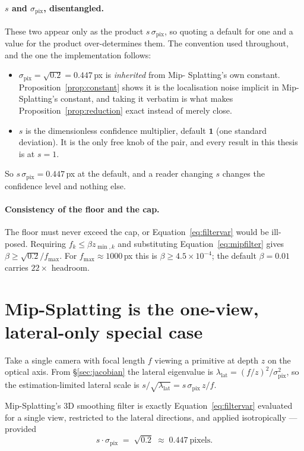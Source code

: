 \paragraph{$s$ and $\sigma_{\mathrm{pix}}$, disentangled.} These two appear only
as the product $s\,\sigma_{\mathrm{pix}}$, so quoting a default for one and a
value for the product over-determines them. The convention used throughout, and
the one the implementation follows:
\begin{itemize}[leftmargin=1.4em,itemsep=2pt]
  \item $\sigma_{\mathrm{pix}} = \sqrt{0.2} = 0.447$\,px is \emph{inherited} from Mip-
  Splatting's own constant. Proposition~\ref{prop:constant} shows it is the localisation
        noise implicit in Mip-Splatting's constant, and taking it verbatim is
        what makes Proposition~\ref{prop:reduction} exact instead of merely close.
  \item $s$ is the dimensionless confidence multiplier, default $\mathbf{1}$
        (one standard deviation). It is the only free knob of the pair, and
        every result in this thesis is at $s=1$.
\end{itemize}
So $s\,\sigma_{\mathrm{pix}} = 0.447$\,px at the default, and a reader changing
$s$ changes the confidence level and nothing else.

\paragraph{Consistency of the floor and the cap.} The floor must never exceed the
cap, or Equation~\eqref{eq:filtervar} would be ill-posed. Requiring
$f_k \le \beta z_{\min,k}$ and substituting Equation~\eqref{eq:mipfilter} gives
$\beta \ge \sqrt{0.2}/f_{\max}$. For $f_{\max}\approx1000$\,px this is
$\beta \ge 4.5\times10^{-4}$; the default $\beta=0.01$ carries $22\times$
headroom.

\section{Mip-Splatting is the one-view, lateral-only special case}
\label{sec:proposition1}
Take a single camera with focal length $f$ viewing a primitive at depth $z$ on
the optical axis. From \S\ref{sec:jacobian} the lateral eigenvalue is
$\lambda_{\mathrm{lat}} = (f/z)^2/\sigma_{\mathrm{pix}}^2$, so the
estimation-limited lateral scale is $s/\sqrt{\lambda_{\mathrm{lat}}} =
s\,\sigma_{\mathrm{pix}}\,z/f$.

\begin{proposition}
\label{prop:constant}
Mip-Splatting's 3D smoothing filter is exactly Equation~\eqref{eq:filtervar}
evaluated for a single view, restricted to the lateral directions, and applied
isotropically --- provided
\[ s\cdot\sigma_{\mathrm{pix}} \;=\; \sqrt{0.2} \;\approx\; 0.447\ \text{pixels}. \]
\end{proposition}

